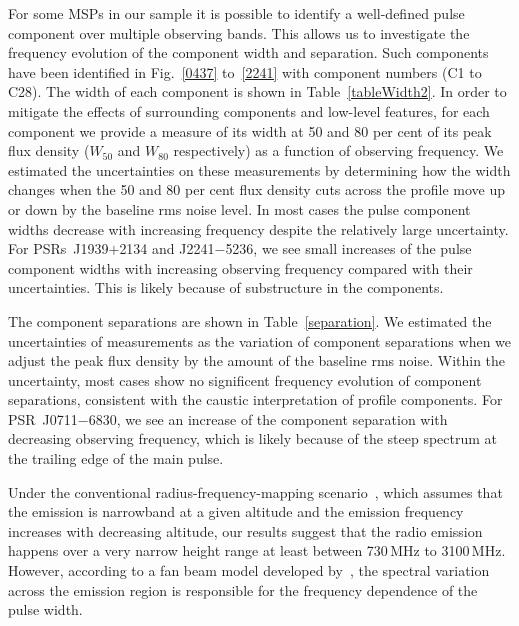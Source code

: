\documentclass[useAMS,usenatbib]{mn2e}
\begin{document}
For some MSPs in our sample it is possible to identify a well-defined pulse component 
over multiple observing bands. This allows us to investigate the frequency 
evolution of the component width and separation. 
%
Such components have been identified in Fig.~\ref{0437} to~\ref{2241} with component 
numbers (C1 to C28).  
%
The width of each component is shown in Table~\ref{tableWidth2}.  
In order to mitigate the effects of surrounding components and low-level features, for
each component we provide a measure of its width at 50 and 80 per cent of its 
peak flux density ($W_{50}$ and $W_{80}$ respectively) as a function of observing frequency.
%
We estimated the uncertainties on these measurements by determining how the width changes when 
the 50 and 80 per cent flux density cuts across the profile move up or down by the baseline rms 
noise level.
%
In most cases the pulse component widths decrease with increasing frequency despite the 
relatively large uncertainty. 
%
For PSRs~J1939$+$2134 and J2241$-$5236, we see small increases of the pulse component
widths with increasing observing frequency compared with their uncertainties. 
%
This is likely because of substructure in the components.
%

The component separations are shown in Table~\ref{separation}. We estimated the 
uncertainties of measurements as the variation of component separations when we 
adjust the peak flux density by the amount of the baseline rms noise.
%
Within the uncertainty, most cases show no significent frequency evolution of 
component separations, consistent with the caustic interpretation of profile components. 
For PSR~J0711$-$6830, we see an increase of the component separation with 
decreasing observing frequency, which is likely because of the steep spectrum 
at the trailing edge of the main pulse.

%
Under the conventional radius-frequency-mapping scenario~\citep{Cordes78}, which assumes that the 
emission is narrowband at a given altitude and the emission frequency increases 
with decreasing altitude, our results suggest that the radio emission happens over 
a very narrow height range at least between 730\,MHz to 3100\,MHz.
%
However, according to a fan beam model developed by~\citet{Wang14}, the spectral 
variation across the emission region is responsible for the frequency dependence 
of the pulse width.
%
\end{document}
